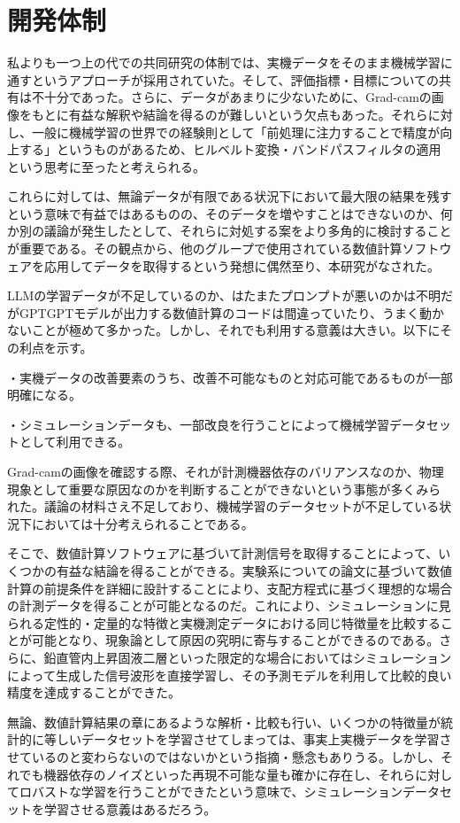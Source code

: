\documentclass[uplatex]{suribt}
\begin{document}
\section{開発体制}
私よりも一つ上の代での共同研究の体制では、実機データをそのまま機械学習に通すというアプローチが採用されていた。そして、評価指標・目標についての共有は不十分であった。さらに、データがあまりに少ないために、Grad-camの画像をもとに有益な解釈や結論を得るのが難しいという欠点もあった。それらに対し、一般に機械学習の世界での経験則として「前処理に注力することで精度が向上する」というものがあるため、ヒルベルト変換・バンドパスフィルタの適用という思考に至ったと考えられる。\par
これらに対しては、無論データが有限である状況下において最大限の結果を残すという意味で有益ではあるものの、そのデータを増やすことはできないのか、何か別の議論が発生したとして、それらに対処する案をより多角的に検討することが重要である。その観点から、他のグループで使用されている数値計算ソフトウェアを応用してデータを取得するという発想に偶然至り、本研究がなされた。\par
LLMの学習データが不足しているのか、はたまたプロンプトが悪いのかは不明だがGPTGPTモデルが出力する数値計算のコードは間違っていたり、うまく動かないことが極めて多かった。しかし、それでも利用する意義は大きい。以下にその利点を示す。\par
・実機データの改善要素のうち、改善不可能なものと対応可能であるものが一部明確になる。\par
・シミュレーションデータも、一部改良を行うことによって機械学習データセットとして利用できる。\par
Grad-camの画像を確認する際、それが計測機器依存のバリアンスなのか、物理現象として重要な原因なのかを判断することができないという事態が多くみられた。議論の材料さえ不足しており、機械学習のデータセットが不足している状況下においては十分考えられることである。\par
そこで、数値計算ソフトウェアに基づいて計測信号を取得することによって、いくつかの有益な結論を得ることができる。実験系についての論文に基づいて数値計算の前提条件を詳細に設計することにより、支配方程式に基づく理想的な場合の計測データを得ることが可能となるのだ。これにより、シミュレーションに見られる定性的・定量的な特徴と実機測定データにおける同じ特徴量を比較することが可能となり、現象論として原因の究明に寄与することができるのである。さらに、鉛直管内上昇固液二層といった限定的な場合においてはシミュレーションによって生成した信号波形を直接学習し、その予測モデルを利用して比較的良い精度を達成することができた。\par
無論、数値計算結果の章にあるような解析・比較も行い、いくつかの特徴量が統計的に等しいデータセットを学習させてしまっては、事実上実機データを学習させているのと変わらないのではないかという指摘・懸念もありうる。しかし、それでも機器依存のノイズといった再現不可能な量も確かに存在し、それらに対してロバストな学習を行うことができたという意味で、シミュレーションデータセットを学習させる意義はあるだろう。\par
\end{document}
